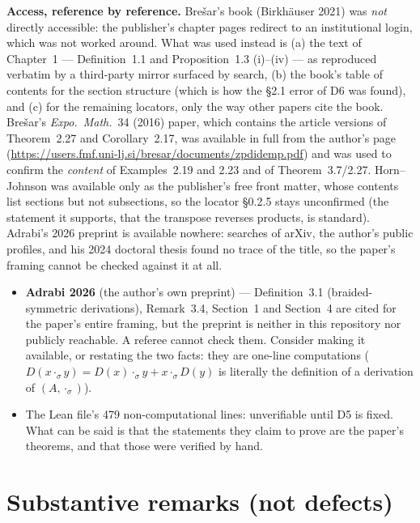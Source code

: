 \documentclass[11pt,a4paper]{article}
\begin{document}
\noindent\textbf{Access, reference by reference.} Bre\v{s}ar's book (Birkh\"auser 2021) was \emph{not}
directly accessible: the publisher's chapter pages redirect to an institutional login, which was not
worked around. What was used instead is (a) the text of Chapter~1 --- Definition~1.1 and
Proposition~1.3 (i)--(iv) --- as reproduced verbatim by a third-party mirror surfaced by search,
(b) the book's table of contents for the section structure (which is how the \S2.1 error of D6 was
found), and (c) for the remaining locators, only the way other papers cite the book. Bre\v{s}ar's
\emph{Expo.\ Math.}\ 34 (2016) paper, which contains the article versions of Theorem~2.27 and
Corollary~2.17, was available in full from the author's page
(\url{https://users.fmf.uni-lj.si/bresar/documents/zpdidemp.pdf}) and was used to confirm the
\emph{content} of Examples~2.19 and 2.23 and of Theorem~3.7/2.27. Horn--Johnson was available only as
the publisher's free front matter, whose contents list sections but not subsections, so the locator
\S0.2.5 stays unconfirmed (the statement it supports, that the transpose reverses products, is
standard). Adrabi's 2026 preprint is available nowhere: searches of arXiv, the author's public
profiles, and his 2024 doctoral thesis found no trace of the title, so the paper's framing cannot be
checked against it at all.

\begin{itemize}
\item \textbf{Adrabi 2026} (the author's own preprint) --- Definition~3.1 (braided-symmetric derivations),
Remark~3.4, Section~1 and Section~4 are cited for the paper's entire framing, but the preprint is neither
in this repository nor publicly reachable. A referee cannot check them. Consider making it available, or
restating the two facts: they are one-line computations ($D(x\cdot_\sigma y)=D(x)\cdot_\sigma y+x\cdot_\sigma
D(y)$ is literally the definition of a derivation of $(A,\cdot_\sigma)$).
\item The Lean file's 479 non-computational lines: unverifiable until D5 is fixed. What can be said is
that the statements they claim to prove are the paper's theorems, and that those were verified by hand.
\end{itemize}

\section{Substantive remarks (not defects)}
\label{sec:remarks}
\end{document}

